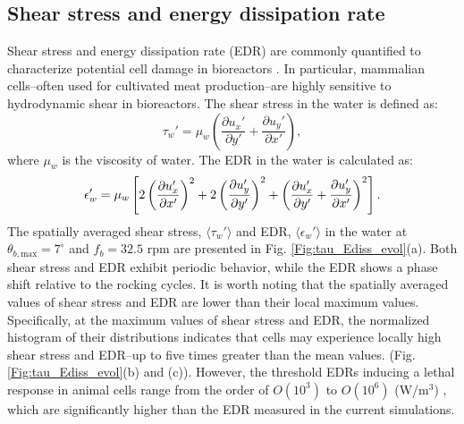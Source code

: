 \documentclass[final,3p,times,twocolumn,authoryear]{elsarticle}
\theoremstyle{definition}
\begin{document}
\subsection{Shear stress and energy dissipation rate} \label{subsec:shear}

Shear stress and energy dissipation rate (EDR) are commonly quantified to characterize potential cell damage in bioreactors \citep{Svay2020,Hu2011,Mcrae2024}. In particular, mammalian cells--often used for cultivated meat production--are highly sensitive to hydrodynamic shear in bioreactors. The shear stress in the water is defined as:
\begin{equation}
    \tau_w' = \mu_w \left(\frac{\partial u_x'}{\partial y'} + \frac{\partial u_y'}{\partial x'} \right) ,
\end{equation}
where $\mu_w$ is the viscosity of water. The EDR in the water is calculated as:
\begin{equation}
    \small
    \epsilon_w' = \mu_w \left[ 2\left(\frac{\partial u_x'}{\partial x'}\right)^2 + 2\left(\frac{\partial u_y'}{\partial y'}\right)^2 + \left(\frac{\partial u_x'}{\partial y'} + \frac{\partial u_y'}{\partial x'} \right)^2 \right].
\end{equation}
The spatially averaged shear stress, $\langle\tau_w'\rangle$ and EDR, $\langle\epsilon_w'\rangle$ in the water at $\theta_{b,\textrm{max}}= 7^{\circ}$ and $f_b=32.5$ rpm are presented in Fig. \ref{Fig:tau_Ediss_evol}(a). Both shear stress and EDR exhibit periodic behavior, while the EDR shows a phase shift relative to the rocking cycles. It is worth noting that the spatially averaged values of shear stress and EDR are lower than their local maximum values. Specifically, at the maximum values of shear stress and EDR, the normalized histogram of their distributions indicates that cells may experience locally high shear stress and EDR--up to five times greater than the mean values. (Fig. \ref{Fig:tau_Ediss_evol}(b) and (c)). However, the threshold EDRs inducing a lethal response in animal cells range from the order of $O(10^3)$ to $O(10^6)$ (W/m$^3$) \citep{Hu2011}, which are significantly higher than the EDR measured in the current simulations.

\end{document}
